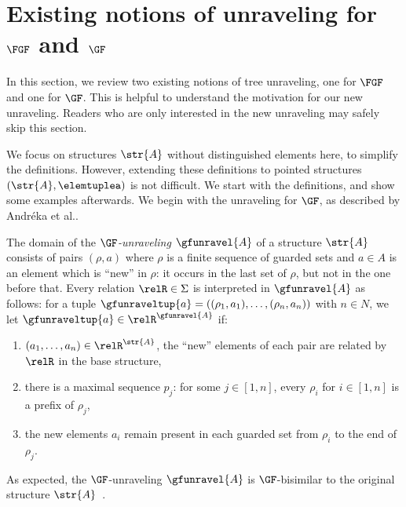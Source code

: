 \section{Existing notions of unraveling for $\FGF$ and $\GF$}\label{sec:existing-unravelings}
In this section, we review two existing notions of tree unraveling, one for $\FGF$ and one for $\GF$.
This is helpful to understand the motivation for our new unraveling.
Readers who are only interested in the new unraveling may safely skip this section.

We focus on structures $\str{A}$ without distinguished elements here, to simplify the definitions.
However, extending these definitions to pointed structures $(\str{A}, \elemtuplea)$ is not difficult.
We start with the definitions, and show some examples afterwards.
We begin with the unraveling for $\GF$, as described by Andréka et al.\cite[Sec 4.3, p. 247]{AndrekaNB98}.
\begin{definition}[$\GF$-unraveling]
  The domain of the \emph{$\GF$-unraveling} $\gfunravel{A}$ of a structure $\str{A}$ consists of pairs $(\rho, a)$ where $\rho$ is a finite sequence of guarded sets and $a \in A$ is an element which is ``new'' in $\rho$: it occurs in the last set of $\rho$, but not in the one before that.
  Every relation $\relR \in \Sigma$ is interpreted in $\gfunravel{A}$ as follows: for a tuple $\gfunraveltup{a} = ((\rho_{1}, a_{1}), \ldots, (\rho_{n}, a_{n}))$ with $n \in N$, we let $\gfunraveltup{a} \in \relR^{\gfunravel{A}}$ if:
  \begin{enumerate}
    \item $(a_{1}, \ldots, a_{n}) \in \relR^{\str{A}}$, \ie{} the ``new'' elements of each pair are related by $\relR$ in the base structure,
    \item there is a maximal sequence $p_{j}$: for some $j \in [1,n]$, every $\rho_{i}$ for $i \in [1,n]$ is a prefix of $\rho_{j}$,
    \item the new elements $a_{i}$ remain present in each guarded set from $\rho_{i}$ to the end of $\rho_{j}$.
  \end{enumerate}
\end{definition}
As expected, the $\GF$-unraveling $\gfunravel{A}$ is $\GF$-bisimilar to the original structure $\str{A}$~\cite[Proposition 4.3.1]{AndrekaNB98}.

